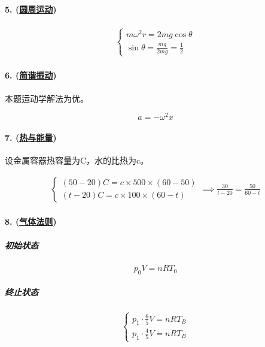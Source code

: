 \paragraph{5. (\hyperref[subsec:圆周运动]{圆周运动})}

\begin{gather*}
    \begin{cases}
        m\omega^2r=2mg\cos\theta\\
        \sin\theta=\frac{mg}{2mg}=\frac12
    \end{cases}
\end{gather*}

\paragraph{6. (\hyperref[subsec:简谐振动]{简谐振动})} 本题运动学解法为优。

\begin{equation*}
    a=-\omega^2x
\end{equation*}

\paragraph{7. (\hyperref[sec:热与能量]{热与能量})} 设金属容器热容量为C，水的比热为c。

\begin{gather*}
    \begin{cases}
        (50-20)C=c\times500\times(60-50)\\
        (t-20)C=c\times100\times(60-t)
    \end{cases}\implies
    \frac{30}{t-20}=\frac{50}{60-t}
\end{gather*}

\paragraph{8. (\hyperref[subsec:气体法则]{气体法则})}

\subparagraph{初始状态}

\begin{equation*}
    p_0V=nRT_0
\end{equation*}

\subparagraph{终止状态}

\begin{equation*}
    \begin{cases}
        p_1\cdot\frac65V=nRT_B\\
        p_1\cdot\frac45V=nRT_B
    \end{cases}
\end{equation*}

